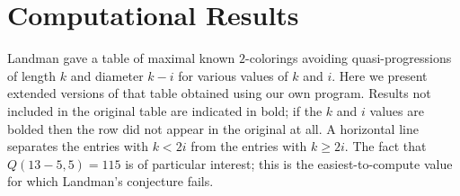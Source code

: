 \section{Computational Results}

Landman \cite{L} gave a table of maximal known $2$-colorings avoiding quasi-progressions of length $k$ and diameter $k-i$ for various values of $k$ and $i$. Here we present extended versions of that table obtained using our own program. Results not included in the original table are indicated in bold; if the $k$ and $i$ values are bolded then the row did not appear in the original at all. A horizontal line separates the entries with $k < 2i$ from the entries with $k \geq 2i$. The fact that $Q\left(13-5,5\right) = 115$ is of particular interest; this is the easiest-to-compute value for which Landman's conjecture fails.

\newcommand*{\updated}[1]{{\bfseries #1}}%

